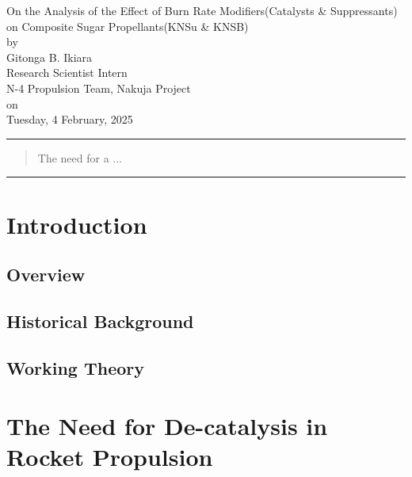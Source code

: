 \documentclass[12pt,letterpaper]{article}
\begin{document}
    \begin{center}
        \huge{On the Analysis of the Effect of Burn Rate Modifiers(Catalysts \&
	Suppressants) on Composite Sugar Propellants(KNSu \& KNSB)}             \\
       	\normalsize{by}        						        \\
        \Large{Gitonga B. Ikiara}	          				\\
        \large{Research Scientist Intern}					\\
        \large{N-4 Propulsion Team, Nakuja Project} 				\\
        \normalsize{on} 							\\
        \large{Tuesday, 4 February, 2025}
    \end{center}

    \rule{\textwidth}{0.5pt}
    \begin{abstract}
        \noindent The need for a ...
    \end{abstract}
    \rule{\textwidth}{0.5pt}

    \section{Introduction}
        \subsection{Overview}
                \lipsum[1-2]
            \subsection{Historical Background}
                    \lipsum[1-3]
        \subsection{Working Theory}
            \lipsum[1-2]\cite{Nakka_2001}

    \section{The Need for De-catalysis in Rocket Propulsion}
\end{document}
